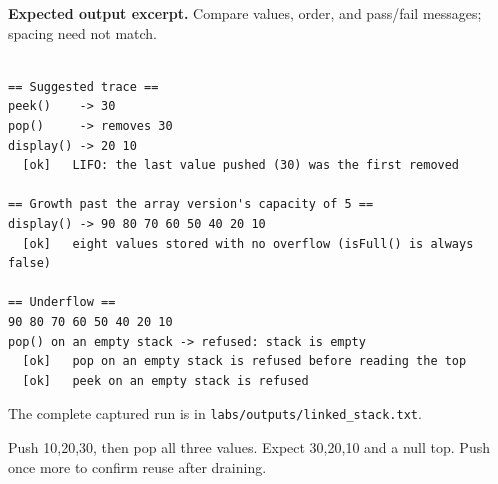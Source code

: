 \textbf{Expected output excerpt.} Compare values, order, and pass/fail messages; spacing need not match.

\begin{lstlisting}[style=utpterminal,language={}]

== Suggested trace ==
peek()    -> 30
pop()     -> removes 30
display() -> 20 10 
  [ok]   LIFO: the last value pushed (30) was the first removed

== Growth past the array version's capacity of 5 ==
display() -> 90 80 70 60 50 40 20 10 
  [ok]   eight values stored with no overflow (isFull() is always false)

== Underflow ==
90 80 70 60 50 40 20 10 
pop() on an empty stack -> refused: stack is empty
  [ok]   pop on an empty stack is refused before reading the top
  [ok]   peek on an empty stack is refused

\end{lstlisting}

The complete captured run is in \texttt{labs/outputs/linked\_stack.txt}.

\begin{tryit}

Push 10,20,30, then pop all three values. Expect 30,20,10 and a null top. Push once more to confirm reuse after draining.

\end{tryit}
